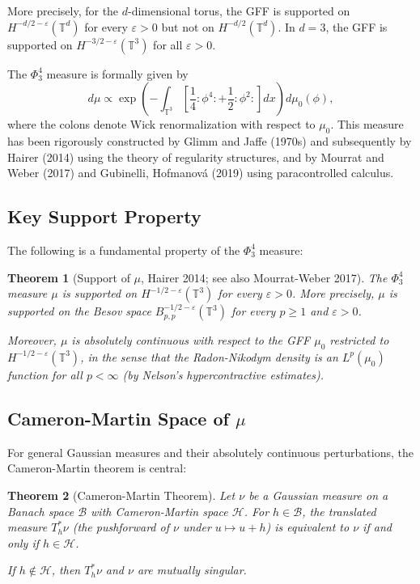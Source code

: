 \documentclass[12pt]{article}
\newtheorem{theorem}{Theorem}
\theoremstyle{definition}
\begin{document}
More precisely, for the $d$-dimensional torus, the GFF is supported on $H^{-d/2-\varepsilon}(\mathbb{T}^d)$ for every $\varepsilon > 0$ but not on $H^{-d/2}(\mathbb{T}^d)$. In $d=3$, the GFF is supported on $H^{-3/2-\varepsilon}(\mathbb{T}^3)$ for all $\varepsilon > 0$.

The $\Phi^4_3$ measure is formally given by
$$d\mu \propto \exp\!\left(-\int_{\mathbb{T}^3} \left[\frac{1}{4}:\!\phi^4\!: + \frac{1}{2}:\!\phi^2\!:\right] dx\right) d\mu_0(\phi),$$
where the colons denote Wick renormalization with respect to $\mu_0$. This measure has been rigorously constructed by Glimm and Jaffe (1970s) and subsequently by Hairer (2014) using the theory of regularity structures, and by Mourrat and Weber (2017) and Gubinelli, Hofmanov\'a (2019) using paracontrolled calculus.

\subsection{Key Support Property}

The following is a fundamental property of the $\Phi^4_3$ measure:

\begin{theorem}[Support of $\mu$, Hairer 2014; see also Mourrat-Weber 2017]\label{thm:support}
The $\Phi^4_3$ measure $\mu$ is supported on $H^{-1/2-\varepsilon}(\mathbb{T}^3)$ for every $\varepsilon > 0$. More precisely, $\mu$ is supported on the Besov space $B^{-1/2-\varepsilon}_{p,p}(\mathbb{T}^3)$ for every $p \geq 1$ and $\varepsilon > 0$.

Moreover, $\mu$ is absolutely continuous with respect to the GFF $\mu_0$ restricted to $H^{-1/2-\varepsilon}(\mathbb{T}^3)$, in the sense that the Radon-Nikodym density is an $L^p(\mu_0)$ function for all $p < \infty$ (by Nelson's hypercontractive estimates).
\end{theorem}

\subsection{Cameron-Martin Space of $\mu$}

For general Gaussian measures and their absolutely continuous perturbations, the Cameron-Martin theorem is central:

\begin{theorem}[Cameron-Martin Theorem]\label{thm:CM}
Let $\nu$ be a Gaussian measure on a Banach space $\mathcal{B}$ with Cameron-Martin space $\mathcal{H}$. For $h \in \mathcal{B}$, the translated measure $T_h^* \nu$ (the pushforward of $\nu$ under $u \mapsto u + h$) is equivalent to $\nu$ if and only if $h \in \mathcal{H}$.

If $h \notin \mathcal{H}$, then $T_h^* \nu$ and $\nu$ are mutually singular.
\end{theorem}
\end{document}
